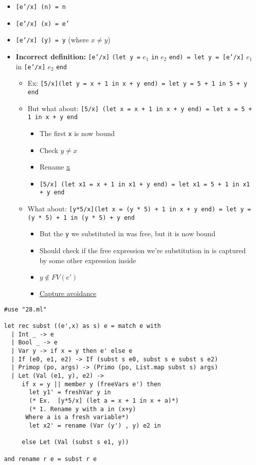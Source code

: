 \documentclass[11pt]{article}
\begin{document}
\begin{itemize}
\item \texttt{[e'/x] (n) = n}
\item \texttt{[e'/x] (x) = e'}
\item \texttt{[e'/x] (y) = y} (where \(x \neq y\))
\item \textbf{Incorrect definition:} \texttt{[e'/x]} \texttt{(let y =} \(e_1\) \texttt{in} \(e_2\) \texttt{end) = let y = [e'/x]} \(e_1\) in \texttt{[e'/x]} \(e_2\) \texttt{end}
\begin{itemize}
\item Ex: \texttt{[5/x](let y = x + 1 in x + y end) = let y = 5 + 1 in 5 + y end}
\item But what about: \texttt{[5/x] (let x = x + 1 in x + y end) = let x = 5 + 1 in x + y end}
\begin{itemize}
\item The first \texttt{x} is now bound
\item Check \(y\neq x\)
\item Rename \uline{x}
\item \texttt{[5/x] (let x1 = x + 1 in x1 + y end) = let x1 = 5 + 1 in x1 + y end}
\end{itemize}
\item What about: \texttt{[y*5/x](let x = (y * 5) + 1 in x + y end) = let y = (y * 5) + 1 in (y * 5) + y end}
\begin{itemize}
\item But the \texttt{y} we substituted in was free, but it is now bound
\item Should check if the free expression we're substitution in is captured by some other expression inside
\item \(y \notin FV(e')\)
\item \uline{Capture avoidance}
\end{itemize}
\end{itemize}
\end{itemize}
\begin{verbatim}
#use "28.ml"

let rec subst ((e',x) as s) e = match e with
  | Int _ -> e
  | Bool _ -> e
  | Var y -> if x = y then e' else e
  | If (e0, e1, e2) -> If (subst s e0, subst s e subst s e2)
  | Primop (po, args) -> (Primo (po, List.map subst s) args)
  | Let (Val (e1, y), e2) ->
     if x = y || member y (freeVars e') then
       let y1' = freshVar y in
       (* Ex.  [y*5/x] (let a = x + 1 in x + a)*)
       (* 1. Rename y with a in (x+y) 
	  Where a is a fresh variable*)
       let x2' = rename (Var (y') , y) e2 in

     else Let (Val (subst s e1, y))

and rename r e = subst r e
\end{verbatim}
\end{document}
